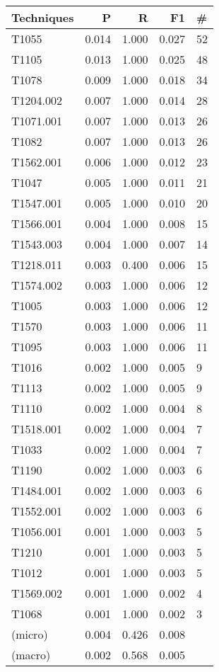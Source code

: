 \begin{tabular}{lrrrl}
    \toprule
    Techniques & P     & R     & F1    & \# \\
    \midrule
    T1055      & 0.014 & 1.000 & 0.027 & 52 \\
    T1105      & 0.013 & 1.000 & 0.025 & 48 \\
    T1078      & 0.009 & 1.000 & 0.018 & 34 \\
    T1204.002  & 0.007 & 1.000 & 0.014 & 28 \\
    T1071.001  & 0.007 & 1.000 & 0.013 & 26 \\
    T1082      & 0.007 & 1.000 & 0.013 & 26 \\
    T1562.001  & 0.006 & 1.000 & 0.012 & 23 \\
    T1047      & 0.005 & 1.000 & 0.011 & 21 \\
    T1547.001  & 0.005 & 1.000 & 0.010 & 20 \\
    T1566.001  & 0.004 & 1.000 & 0.008 & 15 \\
    T1543.003  & 0.004 & 1.000 & 0.007 & 14 \\
    T1218.011  & 0.003 & 0.400 & 0.006 & 15 \\
    T1574.002  & 0.003 & 1.000 & 0.006 & 12 \\
    T1005      & 0.003 & 1.000 & 0.006 & 12 \\
    T1570      & 0.003 & 1.000 & 0.006 & 11 \\
    T1095      & 0.003 & 1.000 & 0.006 & 11 \\
    T1016      & 0.002 & 1.000 & 0.005 & 9  \\
    T1113      & 0.002 & 1.000 & 0.005 & 9  \\
    T1110      & 0.002 & 1.000 & 0.004 & 8  \\
    T1518.001  & 0.002 & 1.000 & 0.004 & 7  \\
    T1033      & 0.002 & 1.000 & 0.004 & 7  \\
    T1190      & 0.002 & 1.000 & 0.003 & 6  \\
    T1484.001  & 0.002 & 1.000 & 0.003 & 6  \\
    T1552.001  & 0.002 & 1.000 & 0.003 & 6  \\
    T1056.001  & 0.001 & 1.000 & 0.003 & 5  \\
    T1210      & 0.001 & 1.000 & 0.003 & 5  \\
    T1012      & 0.001 & 1.000 & 0.003 & 5  \\
    T1569.002  & 0.001 & 1.000 & 0.002 & 4  \\
    T1068      & 0.001 & 1.000 & 0.002 & 3  \\
    (micro)    & 0.004 & 0.426 & 0.008 &    \\
    (macro)    & 0.002 & 0.568 & 0.005 &    \\
    \bottomrule
\end{tabular}
